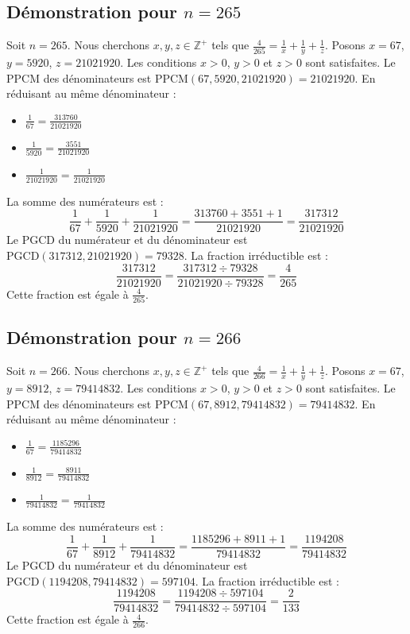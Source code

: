 \documentclass[11pt,a4paper]{article}
\begin{document}
\subsection{Démonstration pour $n = 265$}
Soit $n = 265$. Nous cherchons $x, y, z \in \mathbb{Z}^{+}$ tels que $\frac{4}{265} = \frac{1}{x} + \frac{1}{y} + \frac{1}{z}$.
Posons $x = 67$, $y = 5920$, $z = 21021920$.
Les conditions $x > 0$, $y > 0$ et $z > 0$ sont satisfaites.
Le PPCM des dénominateurs est $\text{PPCM}(67, 5920, 21021920) = 21021920$.
En réduisant au même dénominateur :
\begin{itemize}
    \item $\frac{1}{67} = \frac{313760}{21021920}$
    \item $\frac{1}{5920} = \frac{3551}{21021920}$
    \item $\frac{1}{21021920} = \frac{1}{21021920}$
\end{itemize}
La somme des numérateurs est :
$$ \frac{1}{67} + \frac{1}{5920} + \frac{1}{21021920} = \frac{313760 + 3551 + 1}{21021920} = \frac{317312}{21021920} $$
Le PGCD du numérateur et du dénominateur est $\text{PGCD}(317312, 21021920) = 79328$.
La fraction irréductible est :
$$ \frac{317312}{21021920} = \frac{317312 \div 79328}{21021920 \div 79328} = \frac{4}{265} $$
Cette fraction est égale à $\frac{4}{265}$.

\subsection{Démonstration pour $n = 266$}
Soit $n = 266$. Nous cherchons $x, y, z \in \mathbb{Z}^{+}$ tels que $\frac{4}{266} = \frac{1}{x} + \frac{1}{y} + \frac{1}{z}$.
Posons $x = 67$, $y = 8912$, $z = 79414832$.
Les conditions $x > 0$, $y > 0$ et $z > 0$ sont satisfaites.
Le PPCM des dénominateurs est $\text{PPCM}(67, 8912, 79414832) = 79414832$.
En réduisant au même dénominateur :
\begin{itemize}
    \item $\frac{1}{67} = \frac{1185296}{79414832}$
    \item $\frac{1}{8912} = \frac{8911}{79414832}$
    \item $\frac{1}{79414832} = \frac{1}{79414832}$
\end{itemize}
La somme des numérateurs est :
$$ \frac{1}{67} + \frac{1}{8912} + \frac{1}{79414832} = \frac{1185296 + 8911 + 1}{79414832} = \frac{1194208}{79414832} $$
Le PGCD du numérateur et du dénominateur est $\text{PGCD}(1194208, 79414832) = 597104$.
La fraction irréductible est :
$$ \frac{1194208}{79414832} = \frac{1194208 \div 597104}{79414832 \div 597104} = \frac{2}{133} $$
Cette fraction est égale à $\frac{4}{266}$.
\end{document}
